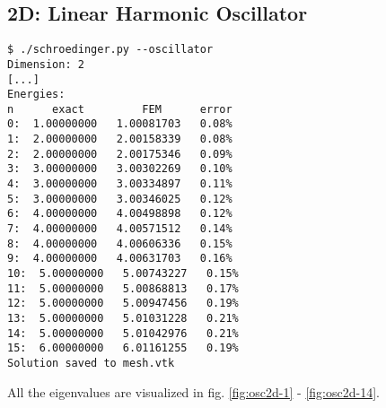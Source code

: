 
\subsection{2D: Linear Harmonic Oscillator}

\begin{lstlisting}
$ ./schroedinger.py --oscillator
Dimension: 2
[...]
Energies:
n      exact         FEM      error
0:  1.00000000   1.00081703   0.08%
1:  2.00000000   2.00158339   0.08%
2:  2.00000000   2.00175346   0.09%
3:  3.00000000   3.00302269   0.10%
4:  3.00000000   3.00334897   0.11%
5:  3.00000000   3.00346025   0.12%
6:  4.00000000   4.00498898   0.12%
7:  4.00000000   4.00571512   0.14%
8:  4.00000000   4.00606336   0.15%
9:  4.00000000   4.00631703   0.16%
10:  5.00000000   5.00743227   0.15%
11:  5.00000000   5.00868813   0.17%
12:  5.00000000   5.00947456   0.19%
13:  5.00000000   5.01031228   0.21%
14:  5.00000000   5.01042976   0.21%
15:  6.00000000   6.01161255   0.19%
Solution saved to mesh.vtk
\end{lstlisting}

All the eigenvalues are visualized in fig. \ref{fig:osc2d-1} -
\ref{fig:osc2d-14}.













